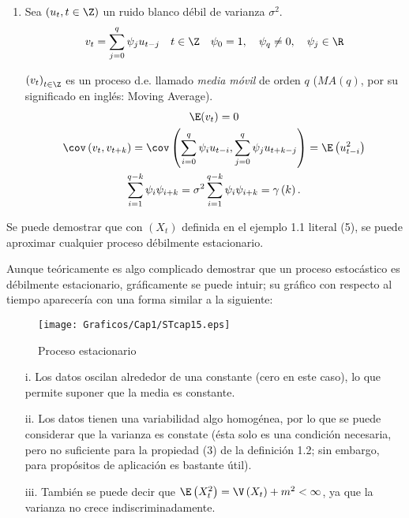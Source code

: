 \begin{ejemplo}
\begin{enumerate}
\item Sea $\left(u_{t} ,t\in \Z \right)$ un ruido blanco d\'{e}bil de varianza $\sigma^{2}$.
\[
	v_{t} =\sum_{j=0}^q {\psi_{j} u_{t-j} } \quad t\in \Z \quad \psi_{0} =1, \quad \psi_{q} \neq 0, \quad \psi_{j} \in \R
\]

$\left( {v_{t} } \right)_{t\in \Z} $ es un proceso d.e. llamado \emph{media m\'{o}vil} de orden $q$ ($MA(q)$, por su significado en ingl\'{e}s: Moving Average).
\begin{gather*}
	\E(v_{t}) =0\\
	\cov\left( {v_{t} ,v_{t+k} } \right)=\cov\left(\sum_{i=0}^q \psi_{i} u_{t-i},\sum_{j=0}^q \psi_{j} u_{t+k-j} \right)=\E\left({u_{t-i}^{2} } \right)\\
	\sum_{i=1}^{q-k} \psi_{i} \psi_{i+k}  =\sigma^{2}\sum_{i=1}^{q-k} \psi_{i} \psi_{i+k} =\gamma \left( k \right).
\end{gather*}

\end{enumerate}
\end{ejemplo}

\begin{observacion}
Se puede demostrar que con $\left( X_{t} \right)$ definida en el ejemplo 1.1 literal (5), se puede aproximar cualquier proceso d\'{e}bilmente estacionario.
\end{observacion}

Aunque te\'{o}ricamente es algo complicado demostrar que un proceso estoc\'{a}stico es d\'{e}bilmente estacionario, gr\'{a}ficamente se puede intuir; su gr\'{a}fico con respecto al tiempo aparecer\'{i}a con una forma similar a la siguiente:

\begin{figure}[H]
\centering
\texttt{[image: Graficos/Cap1/STcap15.eps]}
\caption{Proceso estacionario}
\end{figure}

\begin{enumerate}
\item[i.] Los datos oscilan alrededor de una constante (cero en este caso), lo que permite suponer que la media es constante.
\item[ii.] Los datos tienen una variabilidad algo homog\'{e}nea, por lo que se puede considerar que la varianza es constate (\'{e}sta solo es una condici\'{o}n necesaria, pero no suficiente para la propiedad (3) de la definici\'{o}n 1.2; sin embargo, para prop\'{o}sitos de aplicaci\'{o}n es bastante \'{u}til).
\item[iii.] Tambi\'{e}n se puede decir que $\E\left( X_{t}^{2} \right)=\V\left( X_{t} \right)+m^{2}<\infty $, ya que la varianza no crece indiscriminadamente.
\end{enumerate}

